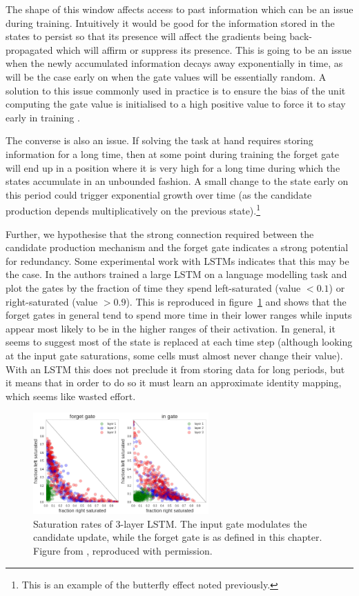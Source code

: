 The shape of this window affects access to past information which can be an issue during training. 
Intuitively it would be good for the
information stored in the states to persist so that its presence will affect the gradients being
back-propagated which will affirm or suppress its presence. This is going to be an issue when
the newly accumulated information decays away exponentially in time, as will be the case early on
when the gate values will be essentially random. A solution to this issue commonly used in
practice is to ensure the bias of the unit computing the gate value 
is initialised to a high positive value to force it to stay early in
training \autocite{Jozefowicz2015}. 

The converse is also an issue. If solving the task at hand requires storing information
for a long time, then at some point during training the forget gate will end up in a position
where it is very high for a long time during which the states accumulate in an unbounded fashion.
A small change to the state early on this period could trigger exponential growth over time
(as the candidate production depends multiplicatively on the previous state).\footnote{
This is an example of the butterfly effect noted previously.}

Further, we hypothesise that the strong connection required between the candidate production
mechanism and the forget gate indicates a strong potential for redundancy. Some experimental work 
with LSTMs indicates that this may be the case.
In \autocite{Karpathy2016} the authors trained a large LSTM on a language modelling task and
plot the gates by the fraction of time they spend left-saturated (value \(<0.1\)) or 
right-saturated (value \(>0.9\)). 
This is reproduced in figure~\ref{fig:karpathy} and shows that the forget gates in general tend to spend
more time in their lower ranges while inputs appear most likely to be in the higher ranges of their
activation. In general, it seems to suggest most of the state is replaced at each time step (although
looking at the input gate saturations, some cells must almost never change their value). With an LSTM
this does not preclude it from storing data for long periods, but it means that in order to do so it
must learn an approximate identity mapping, which seems like wasted effort.

\begin{figure}
\centering
\includegraphics[width=0.6\textwidth]{newarchs/karpathy}
\caption[Saturations of 3-layer LSTM gates]{Saturation rates of 3-layer LSTM. The input gate modulates
the candidate update, while the forget gate is as defined in this chapter. Figure from
\autocite{Karpathy2016}, reproduced with permission.}
\label{fig:karpathy}
\end{figure}

